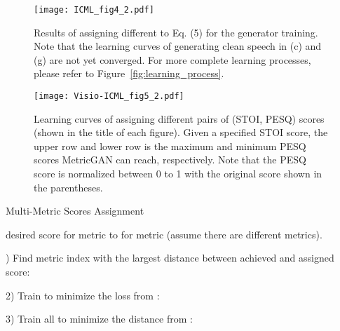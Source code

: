 \documentclass{article}
\begin{document}
\begin{figure*}[ht]
\begin{center}
\centerline{\texttt{[image: ICML\_fig4\_2.pdf]}}
\vskip -0.2in
\caption{Results of assigning different  to Eq. (5) for the generator training. Note that the learning curves of generating clean speech in (c) and (g) are not yet converged. For more complete learning processes, please refer to Figure~\ref{fig:learning_process}.}
\label{fig:demo_different_score}
\end{center}
\vskip -0.2in
\end{figure*}



\begin{figure*}[ht]
\vskip -0.1in
\begin{center}
\centerline{\texttt{[image: Visio-ICML\_fig5\_2.pdf]}}
\vskip -0.2in
\caption{Learning curves of assigning different pairs of (STOI, PESQ) scores (shown in the title of each figure). Given a specified STOI score, the upper row and lower row is the maximum and minimum PESQ scores MetricGAN can reach, respectively. Note that the PESQ score is normalized between 0 to 1 with the original score shown in the parentheses.}
\label{fig:multi-metrics}
\end{center}
\vskip -0.2in
\end{figure*}




\begin{algorithm}[tb]
   \caption{Multi-Metric Scores Assignment}
   \label{alg:multi-metrics}
\begin{algorithmic}
   desired score  for metric  to  for metric  (assume there are  different metrics).
   
   \REPEAT
   ) Find metric index  with the largest distance between achieved and assigned score:
   
   \qquad  \vspace{2mm}
   
   2) Train  to minimize the loss from :
   
   \qquad  \vspace{2mm}
   
   3) Train all  to minimize the distance from : 
    
    \quad 
       
    \end{algorithmic}
    \end{algorithm}
\end{document}
